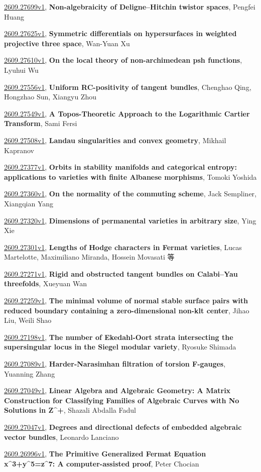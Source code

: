 \documentclass[9pt, a4paper]{article}
\theoremstyle{plain}
\theoremstyle{definition}
\theoremstyle{remark}
\newcommand{\arxiv}[3]{\href{https://arxiv.org/abs/#1}{#1}, \textbf{\textcolor{arxivblue}{#2}}, #3}
\begin{document}
\arxiv{2609.27699v1}{Non-algebraicity of Deligne--Hitchin twistor spaces}{Pengfei Huang}

\arxiv{2609.27625v1}{Symmetric differentials on hypersurfaces in weighted projective three space}{Wan-Yuan Xu}

\arxiv{2609.27610v1}{On the local theory of non-archimedean psh functions}{Lyuhui Wu}

\arxiv{2609.27556v1}{Uniform RC-positivity of tangent bundles}{Chenghao Qing, Hongzhao Sun, Xiangyu Zhou}

\arxiv{2609.27549v1}{A Topos-Theoretic Approach to the Logarithmic Cartier Transform}{Sami Fersi}

\arxiv{2609.27508v1}{Landau singularities and convex geometry}{Mikhail Kapranov}

\arxiv{2609.27377v1}{Orbits in stability manifolds and categorical entropy: applications to varieties with finite Albanese morphisms}{Tomoki Yoshida}

\arxiv{2609.27360v1}{On the normality of the commuting scheme}{Jack Sempliner, Xiangqian Yang}

\arxiv{2609.27320v1}{Dimensions of permanental varieties in arbitrary size}{Ying Xie}

\arxiv{2609.27301v1}{Lengths of Hodge characters in Fermat varieties}{Lucas Martelotte, Maximiliano Miranda, Hossein Movasati 等}

\arxiv{2609.27271v1}{Rigid and obstructed tangent bundles on Calabi--Yau threefolds}{Xueyuan Wan}

\arxiv{2609.27259v1}{The minimal volume of normal stable surface pairs with reduced boundary containing a zero-dimensional non-klt center}{Jihao Liu, Weili Shao}

\arxiv{2609.27198v1}{The number of Ekedahl-Oort strata intersecting the supersingular locus in the Siegel modular variety}{Ryosuke Shimada}

\arxiv{2609.27089v1}{Harder-Narasimhan filtration of torsion F-gauges}{Yuanning Zhang}

\arxiv{2609.27049v1}{Linear Algebra and Algebraic Geometry: A Matrix Construction for Classifying Families of Algebraic Curves with No Solutions in Z^+}{Shazali Abdalla Fadul}

\arxiv{2609.27047v1}{Degrees and directional defects of embedded algebraic vector bundles}{Leonardo Lanciano}

\arxiv{2609.26996v1}{The Primitive Generalized Fermat Equation x^3+y^5=z^7: A computer-assisted proof}{Peter Chocian}
\end{document}
